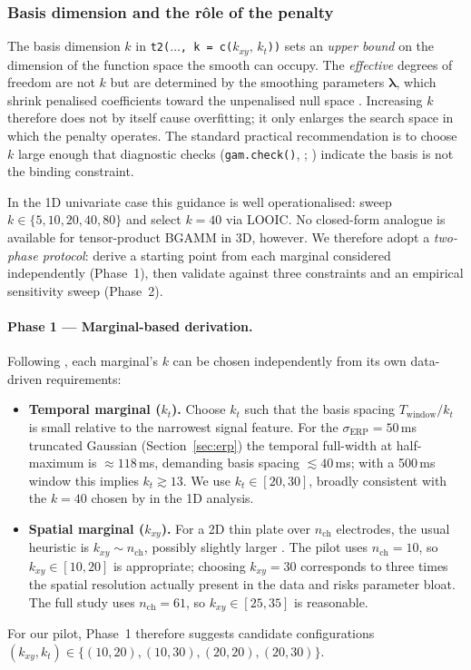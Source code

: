\documentclass[12pt, a4paper]{article}
\begin{document}
\subsubsection{Basis dimension and the rôle of the penalty}\label{sec:theory_k}

The basis dimension $k$ in
\texttt{t2(}$\ldots$\texttt{, k = c(}$k_{xy},\,k_t$\texttt{))} sets an
\emph{upper bound} on the dimension of the function space the smooth
can occupy. The \emph{effective} degrees of freedom are not $k$ but are
determined by the smoothing parameters $\boldsymbol{\lambda}$, which
shrink penalised coefficients toward the unpenalised null space
\citep[\S 5.9]{Wood2017}. Increasing $k$ therefore does not by itself
cause overfitting; it only enlarges the search space in which the
penalty operates. The standard practical recommendation is to choose
$k$ large enough that diagnostic checks (\texttt{gam.check()},
\citealp[\S 5.9.2]{Wood2017}; \citealp{PyaWood2016}) indicate the basis
is not the binding constraint.

In the 1D univariate case this guidance is well operationalised:
\citet[Appendix~B]{Nalborczyk2025} sweep $k \in \{5, 10, 20, 40, 80\}$
and select $k=40$ via LOOIC. No closed-form analogue is available for
tensor-product BGAMM in 3D, however. We therefore adopt a
\emph{two-phase protocol}: derive a starting point from each marginal
considered independently (Phase~1), then validate against three
constraints and an empirical sensitivity sweep (Phase~2).

\paragraph{Phase 1 — Marginal-based derivation.}
Following \citet[\S 4]{Pedersen2019}, each marginal's $k$ can be chosen
independently from its own data-driven requirements:
\begin{itemize}
  \item \textbf{Temporal marginal ($k_t$).}
        Choose $k_t$ such that the basis spacing $T_{\text{window}}/k_t$
        is small relative to the narrowest signal feature. For the
        $\sigma_{\text{ERP}} = 50$\,ms truncated Gaussian
        (Section~\ref{sec:erp}) the temporal full-width at half-maximum
        is $\approx 118$\,ms, demanding basis spacing $\lesssim 40$\,ms;
        with a 500\,ms window this implies $k_t \gtrsim 13$. We use
        $k_t \in [20, 30]$, broadly consistent with the $k = 40$ chosen
        by \citet{Nalborczyk2025} in the 1D analysis.
  \item \textbf{Spatial marginal ($k_{xy}$).}
        For a 2D thin plate over $n_{\mathrm{ch}}$ electrodes, the
        usual heuristic is $k_{xy} \sim n_{\mathrm{ch}}$, possibly
        slightly larger \citep{Wood2017}. The pilot uses
        $n_{\mathrm{ch}} = 10$, so $k_{xy} \in [10, 20]$ is appropriate;
        choosing $k_{xy} = 30$ corresponds to three times the spatial
        resolution actually present in the data and risks parameter
        bloat. The full study uses $n_{\mathrm{ch}} = 61$, so
        $k_{xy} \in [25, 35]$ is reasonable.
\end{itemize}
For our pilot, Phase~1 therefore suggests candidate configurations
$(k_{xy}, k_t) \in \{(10, 20), (10, 30), (20, 20), (20, 30)\}$.
\end{document}
